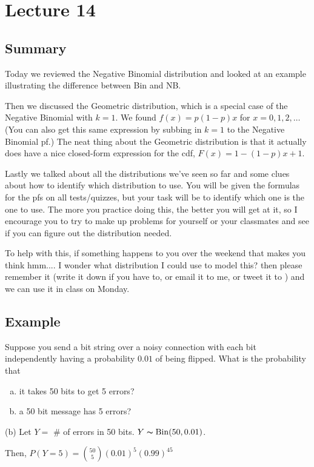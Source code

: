 \section{Lecture 14}
\subsection{Summary}
Today we reviewed the Negative Binomial distribution and looked at an example illustrating the difference between Bin and NB.

Then we discussed the Geometric distribution, which is a special case of the Negative Binomial with $k=1$. We found $f(x)=p(1-p)x$ for $x = 0,1,2,\ldots$ (You can also get this same expression by subbing in $k=1$ to the Negative Binomial pf.) The neat thing about the Geometric distribution is that it actually does have a nice closed-form expression for the cdf, $F(x)=1-(1-p)x+1$.

Lastly we talked about all the distributions we've seen so far and some clues about how to identify which distribution to use. You will be given the formulas for the pfs on all tests/quizzes, but your task will be to identify which one is the one to use. The more you practice doing this, the better you will get at it, so I encourage you to try to make up problems for yourself or your classmates and see if you can figure out the distribution needed.

To help with this, if something happens to you over the weekend that makes you think hmm.... I wonder what distribution I could use to model this? then please remember it (write it down if you have to, or email it to me, or tweet it to \@ActSciProf) and we can use it in class on Monday.

\subsection{Example}
Suppose you send a bit string over a noisy connection with
each bit independently having a probability $ 0.01 $ of being
flipped. What is the probability that
\begin{enumerate}[(a)]
    \item it takes 50 bits to get 5 errors?
    \item a 50 bit message has 5 errors?
\end{enumerate}

(b) Let $ Y= $ \# of errors in 50 bits. $ Y\thicksim\operatorname{Bin}(50,0.01) $.

Then, $ P(Y=5)=\binom{50}{5}(0.01)^5(0.99)^{45} $

